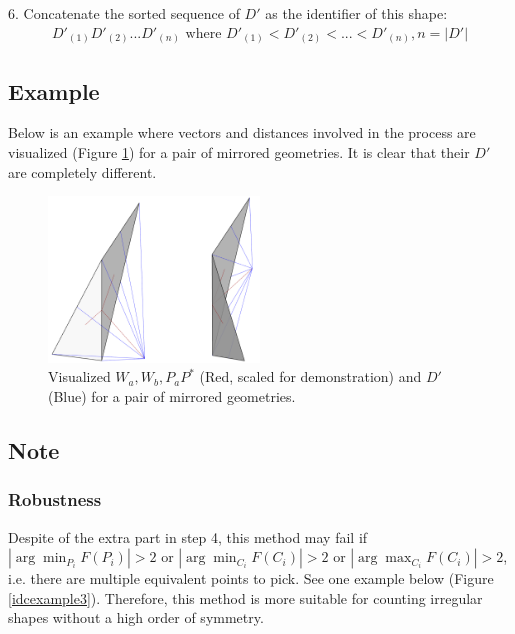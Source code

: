 \documentclass{article}
\begin{document}
6. Concatenate the sorted sequence of $D'$ as the identifier of this shape:
\begin{align*}
	D'_{(1)}D'_{(2)}...D'_{(n)} \text{ where } D'_{(1)} < D'_{(2)} < ... < D'_{(n)}, n = |D'|
\end{align*}

\subsection{Example}

Below is an example where vectors and distances involved in the process are visualized (Figure \ref{idexample3}) for a pair of mirrored geometries. It is clear that their $D'$ are completely different.

\begin{figure}[hbt!]
	\centering
	\includegraphics[width=0.5\textwidth]{Figures/IdentifierExample3.png}
	\caption{
        Visualized $W_a, W_b, P_aP^*$ (Red, scaled for demonstration) and $D'$ (Blue) for a pair of mirrored geometries.
    }
	\label{idexample3}
\end{figure}

\FloatBarrier

\subsection{Note}

\subsubsection{Robustness} \label{robustness} Despite of the extra part in step 4, this method may fail if $|\arg \min_{P_i}F(P_i)| > 2$ or $|\arg \min_{C_i}F(C_i)| > 2$ or $|\arg \max_{C_i}F(C_i)| > 2$, i.e. there are multiple equivalent points to pick. See one example below (Figure \ref{idcexample3}). Therefore, this method is more suitable for counting irregular shapes without a high order of symmetry.
\end{document}
